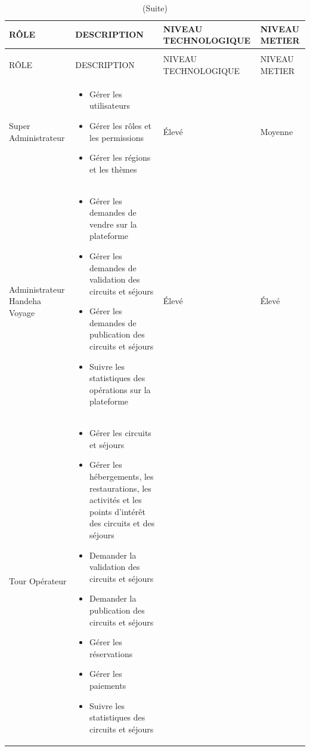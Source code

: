 \documentclass[12pt]{report}
\begin{document}
				\begin{longtable}{|p{3cm}|p{5cm}|p{3cm}|p{3cm}|} 
						\caption{Comparaison entre Katappult et Budibase.} 
						\label{tab:listeActeurs}\\ 
						\hline 
						RÔLE & DESCRIPTION & NIVEAU TECHNOLOGIQUE & NIVEAU METIER\\ 
						\hline 
						\endfirsthead 	
						\caption[]{(Suite)}\\ 
						\hline 
						RÔLE & DESCRIPTION & NIVEAU TECHNOLOGIQUE & NIVEAU METIER\\ 
						\hline 
						\endhead
						Super Administrateur & 
	
						\begin{itemize}
							\item Gérer les utilisateurs
							\item Gérer les rôles et les permissions
							\item Gérer les régions et les thèmes 							
						\end{itemize}
						
						& Élevé&Moyenne\\
						\hline
						Administrateur Handeha Voyage & 

						\begin{itemize}
							
							\item Gérer les demandes de vendre sur la plateforme
							\item Gérer les demandes de validation des circuits et séjours
							\item Gérer les demandes de publication des circuits et séjours 
							\item Suivre les statistiques des opérations sur la plateforme

						\end{itemize}
						
						& Élevé&Élevé\\
						\hline
						Tour Opérateur & 

						\begin{itemize}
							\item Gérer les circuits et séjours
							\item Gérer les hébergements, les restaurations, les activités et les points d'intérêt des circuits et des séjours
							\item Demander la validation des circuits et séjours
							\item Demander la publication des circuits et séjours
							\item Gérer les réservations
							\item Gérer les paiements
							\item Suivre les statistiques des circuits et séjours
						\end{itemize}


\end{longtable}
\end{document}
